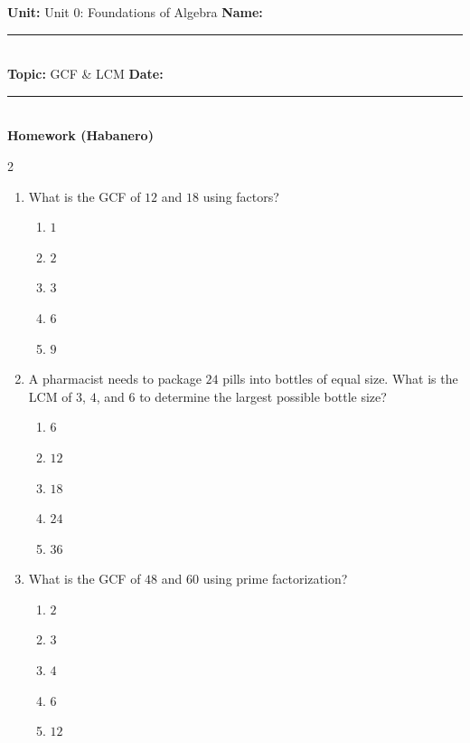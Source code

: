 \documentclass[10pt]{article}
\begin{document}
\enlargethispage{2.5cm}

\begin{tcolorbox}[colback=mainblue!5, colframe=mainblue, sharp corners, boxrule=0.5pt]
    \small \textbf{Unit:} Unit 0: Foundations of Algebra \hfill \textbf{Name:} \rule{3cm}{0.4pt} \\
    \small \textbf{Topic:} GCF & LCM \hfill \textbf{Date:} \rule{2cm}{0.4pt} \\
    \centering \textbf{\large Homework (Habanero)}
\end{tcolorbox}

\vspace{0.2cm}

\begin{multicols}{2}
\begin{enumerate}[label=\textbf{Q\arabic*.}, leftmargin=*, itemsep=6pt, parsep=0pt]

  \item \small What is the GCF of $12$ and $18$ using factors?
  \begin{enumerate}[label=(\Alph*), leftmargin=0.6cm, nosep, itemsep=2pt]
    \item $1$
    \item $2$
    \item $3$
    \item $6$
    \item $9$
  \end{enumerate}

  \item \small A pharmacist needs to package $24$ pills into bottles of equal size. What is the LCM of $3$, $4$, and $6$ to determine the largest possible bottle size?
  \begin{enumerate}[label=(\Alph*), leftmargin=0.6cm, nosep, itemsep=2pt]
    \item $6$
    \item $12$
    \item $18$
    \item $24$
    \item $36$
  \end{enumerate}

  \item \small What is the GCF of $48$ and $60$ using prime factorization?
  \begin{enumerate}[label=(\Alph*), leftmargin=0.6cm, nosep, itemsep=2pt]
    \item $2$
    \item $3$
    \item $4$
    \item $6$
    \item $12$
  \end{enumerate}


\end{enumerate}
\end{multicols}
\end{document}

